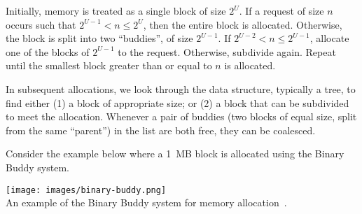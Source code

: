 Initially, memory is treated as a single block of size $2^{U}$. If a request of size $n$ occurs such that $2^{U-1} < n \leq 2^{U}$, then the entire block is allocated. Otherwise, the block is split into two ``buddies'', of size $2^{U-1}$. If $2^{U-2} < n \leq 2^{U-1}$, allocate one of the blocks of $2^{U-1}$ to the request. Otherwise, subdivide again. Repeat until the smallest block greater than or equal to $n$ is allocated. 

In subsequent allocations, we look through the data structure, typically a tree, to find either (1) a block of appropriate size; or (2) a block that can be subdivided to meet the allocation. Whenever a pair of buddies (two blocks of equal size, split from the same ``parent'') in the list are both free, they can be coalesced.

Consider the example below where a 1~MB block is allocated using the Binary Buddy system.

\begin{center}
\texttt{[image: images/binary-buddy.png]}\\
An example of the Binary Buddy system for memory allocation~\cite{osi}.
\end{center}




